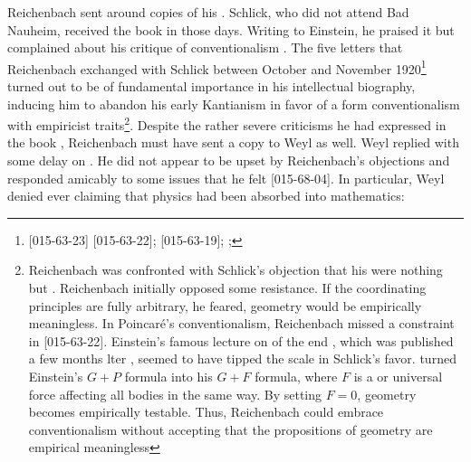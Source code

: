 \documentclass[final]{article}
\begin{document}
Reichenbach sent around copies of his  \citep{Reichenbach1920a}. Schlick, who did not attend Bad Nauheim, received the book in those days. Writing to Einstein, he praised it but complained about his critique of conventionalism . The five letters that Reichenbach exchanged with Schlick between October and November 1920\footnote{[015-63-23]
[015-63-22];
[015-63-19]; ; } turned out to be of fundamental importance in his intellectual biography, inducing him to abandon his early Kantianism in favor of a form conventionalism with empiricist traits\footnote{Reichenbach was confronted with Schlick's objection that his  were nothing but . Reichenbach initially opposed some resistance. If the coordinating principles are fully arbitrary, he feared, geometry would be empirically meaningless. In Poincaré's conventionalism, Reichenbach missed a constraint in  [015-63-22]. Einstein's famous lecture on  of the end , which was published a few months lter \citep{Einstein1921}, seemed to have tipped the scale in Schlick's favor. \citet{Reichenbach1922a} turned Einstein's $G+P$ formula into his $G + F$ formula, where $F$ is a  or universal force affecting all bodies in the same way. By setting $F=0$, geometry becomes empirically testable. Thus, Reichenbach could embrace conventionalism without accepting that the propositions of geometry are empirical meaningless}. Despite the rather severe criticisms he had expressed in the book \citep{Rynasiewicz2005}, Reichenbach must have sent a copy to Weyl as well. Weyl replied with some delay on . He did not appear to be upset by Reichenbach's objections and responded amicably to some issues that he felt  [015-68-04]. In particular, Weyl denied ever claiming that physics had been absorbed into mathematics:
\end{document}
